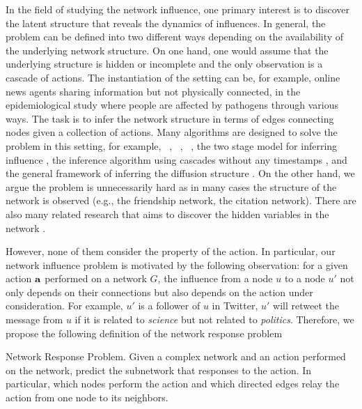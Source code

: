 {In the field of studying the network influence, one primary interest is to discover the latent structure that reveals the dynamics of influences.
In general, the problem can be defined into two different ways depending on the availability of the underlying network structure.
On one hand, one would assume that the underlying structure is hidden or incomplete and the only observation is a cascade of actions.
The instantiation of the setting can be, for example,
online news agents sharing information but not physically connected,
in the epidemiological study where people are affected by pathogens through various ways.
The task is to infer the network structure in terms of edges connecting nodes given a collection of actions.
Many algorithms are designed to solve the problem in this setting, for example, \netinf\ \citep{GomezRodriguez10inferring}, \netrate\ \citep{Rodrigues11unconvering}, \ \citep{Du12learning}, the two stage model for inferring influence \citep{Du14influence}, the inference algorithm using cascades without any timestamps \citep{Amin14learning}, and the general framework of inferring the diffusion structure \citep{Daneshmand14estimating}.
On the other hand, we argue the problem is unnecessarily hard as in many cases the structure of the network is observed (e.g., the friendship network, the citation network).
There are also many related research that aims to discover the hidden variables in the network \citep{Lovrek08prediction,Goyal10learning}.

However, none of them consider the property of the action.
In particular, our network influence problem is motivated by the following observation: for a given action $\mathbf {a}$ performed on a network $G$, the influence from a node $u$ to a node $u'$ not only depends on their connections but also depends on the action under consideration.
For example, $u'$ is a follower of $u$ in Twitter, $u'$ will retweet the message from $u$ if it is related to \textit{science} but not related to \textit{politics}.
Therefore, we propose the following definition of the network response problem
\begin{definition}{Network Response Problem.}
	Given a complex network and an action performed on the network, predict the subnetwork that responses to the action. In particular, which nodes perform the action and which directed edges relay the action from one node to its neighbors.
\end{definition}

}
